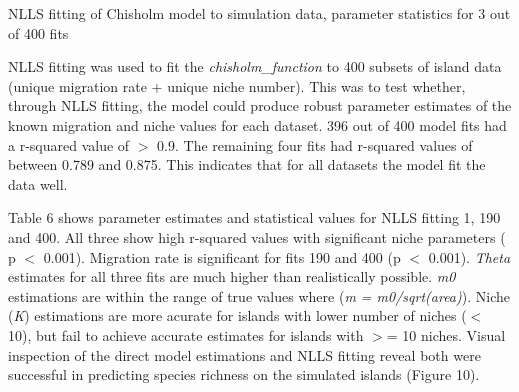 \documentclass{article}
\begin{document}
\begin{table}[h!]
\caption{NLLS fitting of Chisholm model to simulation data, parameter statistics for 3 out of 400 fits}
\centering
{}
   \end{table}\bigskip
   
\noindent NLLS fitting was used to fit the \textit{chisholm\_function} to 400 subsets of island data (unique migration rate + unique niche number). This was to test whether, through NLLS fitting, the model could produce robust parameter estimates of the known migration and niche values for each dataset. 396 out of 400 model fits had a r-squared value of $>$ 0.9. The remaining four fits had r-squared values of between 0.789 and 0.875. This indicates that for all datasets the model fit the data well. \bigskip

\noindent Table 6 shows parameter estimates and statistical values for NLLS fitting 1, 190 and 400. All three show high r-squared values with significant niche parameters ( p $<$ 0.001). Migration rate is significant for fits 190 and 400 (p $<$ 0.001). \textit{Theta} estimates for all three fits are much higher than realistically possible. \textit{m0} estimations are within the range of true values where (\textit{m = m0/sqrt(area)}). Niche (\textit{K}) estimations are more acurate for islands with lower number of niches ($<$ 10), but fail to achieve accurate estimates for islands with $>$= 10 niches. Visual inspection of the direct model estimations and NLLS fitting reveal both were successful in predicting species richness on the simulated islands (Figure 10).
\end{document}
